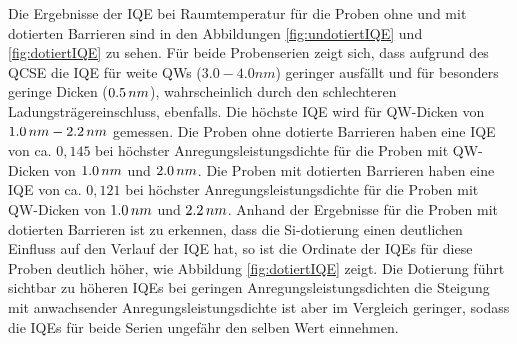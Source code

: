\noindent 
Die Ergebnisse der IQE bei Raumtemperatur für die Proben ohne und mit dotierten Barrieren sind in den Abbildungen 
\ref{fig:undotiertIQE} und \ref{fig:dotiertIQE} zu sehen. Für beide Probenserien zeigt sich, dass aufgrund des QCSE die IQE für weite QWs 
($3.0 -4.0  nm$) geringer ausfällt und für besonders geringe Dicken ($0.5\thinspace nm$), wahrscheinlich durch den schlechteren Ladungsträgereinschluss, ebenfalls. Die höchste IQE wird für QW-Dicken von $1.0 \thinspace nm- 2.2 \thinspace nm$ gemessen. Die Proben ohne dotierte Barrieren haben eine IQE von ca. $0,145$ bei höchster Anregungsleistungsdichte für die Proben mit QW-Dicken von $1.0 \thinspace nm$ und $2.0\thinspace nm$. 
\newline
Die Proben mit dotierten Barrieren haben eine IQE von ca. $0,121$ bei höchster Anregungsleistungsdichte für die Proben mit QW-Dicken von $1.0 \thinspace nm$ und $2.2\thinspace nm$. Anhand der Ergebnisse für die Proben mit dotierten Barrieren ist zu erkennen, dass die Si-dotierung einen deutlichen Einfluss auf den Verlauf der IQE hat, so ist die Ordinate der IQEs für diese Proben deutlich höher, wie Abbildung \ref{fig:dotiertIQE} zeigt. Die Dotierung führt sichtbar zu höheren IQEs bei geringen Anregungsleistungsdichten die Steigung mit anwachsender Anregungsleistungsdichte ist aber im Vergleich geringer, sodass die IQEs für beide Serien ungefähr den selben Wert einnehmen.

